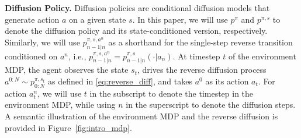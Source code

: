 \textbf{Diffusion Policy. }Diffusion policies are conditional diffusion models that generate action $a$ on a given state $s$. In this paper, we will use $p^\pi$ and $p^{\pi, s}$ to denote the diffusion policy and its state-conditioned version, respectively. Similarly, we will use $p^{\pi,s,a^n}_{n-1|n}$ as a shorthand for the single-step reverse transition conditioned on $a^n$, i.e., $p^{\pi,s,a^n}_{n-1|n}=p^{\pi,s}_{n-1|n}(\cdot|a_n)$. At timestep $t$ of the environment MDP, the agent observes the state $s_t$, drives the reverse diffusion process $a^{0:N}\sim p^{\pi,s_t}_{0:N}$ as defined in \eqref{eq:reverse_diff}, and takes $a^0$ as its action $a_t$. For action $a_t^n$, we will use $t$ in the subscript to denote the timestep in the environment MDP, while using $n$ in the superscript to denote the diffusion steps. A semantic illustration of the environment MDP and the reverse diffusion is provided in Figure~\ref{fig:intro_mdp}.





